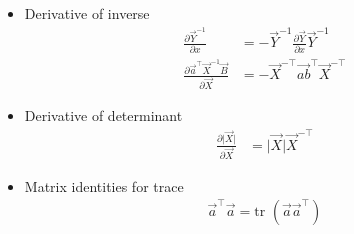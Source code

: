 \documentclass[12pt,twoside]{article}
\begin{document}
\begin{itemize}
\item Derivative of inverse
	\begin{align*}
		\frac{\partial \vec{Y}^{-1}}{\partial x} &= -\vec{Y}^{-1}\frac{\partial \vec{Y}}{\partial x}\vec{Y}^{-1}\\
		\frac{\partial \vec{a}^\top\vec{X}^{-1}\vec{B}}{\partial \vec{X}} &= -\vec{X}^{-\top}\vec{ab}^\top\vec{X}^{-\top}
	\end{align*}

\item Derivative of determinant
	\begin{align*}
		\frac{\partial \vert \vec{X}\vert}{\partial \vec{X}} & = \vert \vec{X}\vert \vec{X}^{-\top}
	\end{align*}

\item Matrix identities for trace
	\begin{align*}
		\vec{a}^\top \vec{a} = \text{tr }(\vec{a}\vec{a}^\top)
	\end{align*}

\end{itemize}
\end{document}
